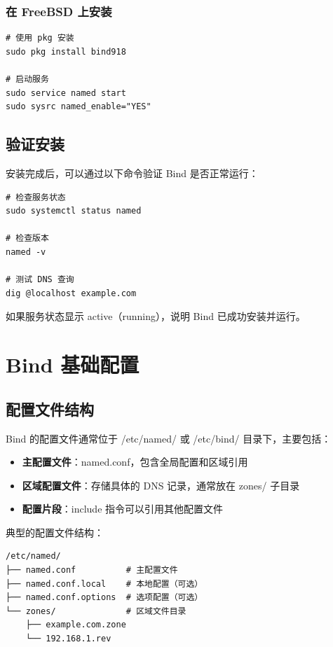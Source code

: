 \documentclass[12pt,UTF8]{ctexbook}
\begin{document}
\subsection{在 FreeBSD 上安装}

\begin{verbatim}
# 使用 pkg 安装
sudo pkg install bind918

# 启动服务
sudo service named start
sudo sysrc named_enable="YES"
\end{verbatim}

\section{验证安装}
\label{sec:verify_install}

安装完成后，可以通过以下命令验证 Bind 是否正常运行：

\begin{verbatim}
# 检查服务状态
sudo systemctl status named

# 检查版本
named -v

# 测试 DNS 查询
dig @localhost example.com
\end{verbatim}

如果服务状态显示 active（running），说明 Bind 已成功安装并运行。

\chapter{Bind 基础配置}
\label{chap:bind_basic_config}

\section{配置文件结构}
\label{sec:config_file_structure}

Bind 的配置文件通常位于 /etc/named/ 或 /etc/bind/ 目录下，主要包括：

\begin{itemize}
    \item \textbf{主配置文件}：named.conf，包含全局配置和区域引用
    \item \textbf{区域配置文件}：存储具体的 DNS 记录，通常放在 zones/ 子目录
    \item \textbf{配置片段}：include 指令可以引用其他配置文件
\end{itemize}

典型的配置文件结构：
\begin{verbatim}
/etc/named/
├── named.conf          # 主配置文件
├── named.conf.local    # 本地配置（可选）
├── named.conf.options  # 选项配置（可选）
└── zones/              # 区域文件目录
    ├── example.com.zone
    └── 192.168.1.rev
\end{verbatim}
\end{document}
